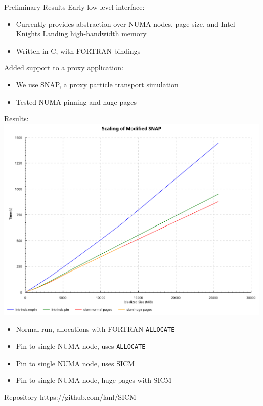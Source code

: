 \documentclass[final,hyperref={pdfpagelabels=false}]{beamer}
\begin{document}
\begin{frame}{}
\begin{columns}[t]
  \begin{column}{.45\linewidth}
    \begin{block}{Preliminary Results}
      Early low-level interface:
      \begin{itemize}
        \item Currently provides abstraction over NUMA nodes, page size, and Intel Knights Landing high-bandwidth memory
        \item Written in C, with FORTRAN bindings
      \end{itemize}
      Added support to a proxy application:
      \begin{itemize}
        \item We use SNAP, a proxy particle transport simulation
        \item Tested NUMA pinning and huge pages
      \end{itemize}
      Results:
      \includegraphics[width=\textwidth]{snap.pdf}
      \begin{itemize}
        \item \textcolor{plotblue}{Normal run, allocations with FORTRAN \texttt{ALLOCATE}}
        \item \textcolor{plotgreen}{Pin to single NUMA node, uses \texttt{ALLOCATE}}
        \item \textcolor{plotred}{Pin to single NUMA node, uses SICM}
        \item \textcolor{plotyellow}{Pin to single NUMA node, huge pages with SICM}
      \end{itemize}
    \end{block}
    
    \begin{block}{Repository}
      https://github.com/lanl/SICM
    \end{block}
  \end{column}
\end{columns}
\end{frame}
\end{document}
